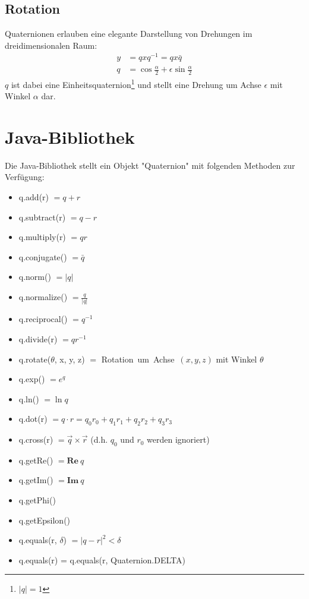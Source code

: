 \documentclass[12pt]{article}
\begin{document}
  \subsection{Rotation}

  Quaternionen erlauben eine elegante Darstellung von Drehungen im dreidimensionalen Raum:
  \begin{align*}
    y &= q x q^{-1} = q x \bar{q} \\
	q &= \cos{\frac{\alpha}{2}} + \epsilon \sin{\frac{\alpha}{2}}
  \end{align*}
  $q$ ist dabei eine Einheitsquaternion\footnote{$\lvert q \rvert = 1$} und stellt eine Drehung um Achse $\epsilon$ mit Winkel $\alpha$ dar.



  \section{Java-Bibliothek}

  Die Java-Bibliothek stellt ein Objekt "Quaternion" mit folgenden Methoden zur Verfügung:
  \begin{itemize}
    \item q.add(r) $= q + r$
    \item q.subtract(r) $= q - r$
    \item q.multiply(r) $= q r$
    \item q.conjugate() $= \bar{q}$
    \item q.norm() $= \lvert q \rvert$
    \item q.normalize() $= \frac{q}{\lvert q \rvert}$
    \item q.reciprocal() $= q^{-1}$
    \item q.divide(r) $= q r^{-1}$
    \item q.rotate($\theta$, x, y, z) $=$ Rotation\ um\ Achse\ $(x, y, z)$ mit Winkel $\theta$
    \item q.exp() $= e^q$
    \item q.ln() $= \ln q$
    \item q.dot(r) $= q \cdot r = q_0 r_0 + q_1 r_1 + q_2 r_2 + q_3 r_3$
    \item q.cross(r) $= \vec{q} \times \vec{r}$ (d.h. $q_0$ und $r_0$ werden ignoriert)
    \item q.getRe() $= \mathbf{Re}\ q$
    \item q.getIm() $= \mathbf{Im}\ q$
    \item q.getPhi()
    \item q.getEpsilon()
    \item q.equals(r, $\delta$) $= |q - r|^2 < \delta$
    \item q.equals(r) = q.equals(r, Quaternion.DELTA)
  \end{itemize}
\end{document}
